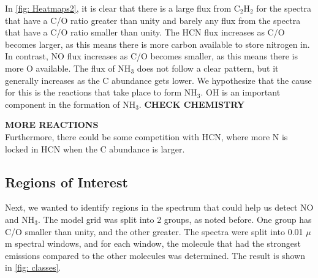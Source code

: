 \documentclass[twoside, single, authoryear, semicolon, 12pt]{lion-msc}
\newcommand{\4}{$_4$}
\newcommand{\3}{$_3$}
\newcommand{\2}{$_2$}
\begin{document}
In \autoref{fig: Heatmaps2}, it is clear that there is a large flux from C\2H\2 for the spectra that have a C/O ratio greater than unity and barely any flux from the spectra that have a C/O ratio smaller than unity. The HCN flux increases as C/O becomes larger, as this means there is more carbon available to store nitrogen in. In contrast, NO flux increases as C/O becomes smaller, as this means there is more O available. The flux of NH\3 does not follow a clear pattern, but it generally increases as the C abundance gets lower. We hypothesize that the cause for this is the reactions that take place to form NH\3.
OH is an important component in the formation of NH\3. \textbf{CHECK CHEMISTRY}


\textbf{MORE REACTIONS}\\
Furthermore, there could be some competition with HCN, where more N is locked in HCN when the C abundance is larger. 

\subsection{Regions of Interest}
Next, we wanted to identify regions in the spectrum that could help us detect NO and NH\3. The model grid was split into 2 groups, as noted before. One group has C/O smaller than unity, and the other greater. The spectra were split into 0.01 $\mu$m spectral windows, and for each window, the molecule that had the strongest emissions compared to the other molecules was determined. The result is shown in \autoref{fig: classes}.


\end{document}
